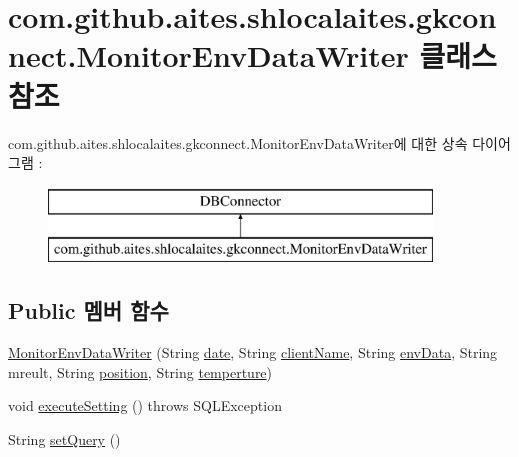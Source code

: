 \hypertarget{classcom_1_1github_1_1aites_1_1shlocalaites_1_1gkconnect_1_1_monitor_env_data_writer}{}\section{com.\+github.\+aites.\+shlocalaites.\+gkconnect.\+Monitor\+Env\+Data\+Writer 클래스 참조}
\label{classcom_1_1github_1_1aites_1_1shlocalaites_1_1gkconnect_1_1_monitor_env_data_writer}
com.\+github.\+aites.\+shlocalaites.\+gkconnect.\+Monitor\+Env\+Data\+Writer에 대한 상속 다이어그램 \+: \begin{figure}[H]
\begin{center}
\leavevmode
\includegraphics[height=2.000000cm]{classcom_1_1github_1_1aites_1_1shlocalaites_1_1gkconnect_1_1_monitor_env_data_writer}
\end{center}
\end{figure}
\subsection*{Public 멤버 함수}
\begin{DoxyCompactItemize}
\item 
\mbox{\hyperlink{classcom_1_1github_1_1aites_1_1shlocalaites_1_1gkconnect_1_1_monitor_env_data_writer_ab7d3d6af52342f720749695ec40aef43}{Monitor\+Env\+Data\+Writer}} (String \mbox{\hyperlink{classcom_1_1github_1_1aites_1_1shlocalaites_1_1gkconnect_1_1_monitor_env_data_writer_a04cac2bb3a2553675195bab75d11ecd4}{date}}, String \mbox{\hyperlink{classcom_1_1github_1_1aites_1_1shlocalaites_1_1gkconnect_1_1_monitor_env_data_writer_aace57a568b525d7bced3189c5ce11722}{client\+Name}}, String \mbox{\hyperlink{classcom_1_1github_1_1aites_1_1shlocalaites_1_1gkconnect_1_1_monitor_env_data_writer_a2f1b25081ef6c871c400583913e5a5a2}{env\+Data}}, String mreult, String \mbox{\hyperlink{classcom_1_1github_1_1aites_1_1shlocalaites_1_1gkconnect_1_1_monitor_env_data_writer_a087d637fddca614523c49e762de1e563}{position}}, String \mbox{\hyperlink{classcom_1_1github_1_1aites_1_1shlocalaites_1_1gkconnect_1_1_monitor_env_data_writer_a4360d90fa0ab7d3d76b2f4fd383f17da}{temperture}})
\item 
void \mbox{\hyperlink{classcom_1_1github_1_1aites_1_1shlocalaites_1_1gkconnect_1_1_monitor_env_data_writer_aa117721e9020fcc1de6abb9b7f79c367}{execute\+Setting}} ()  throws S\+Q\+L\+Exception 
\item 
String \mbox{\hyperlink{classcom_1_1github_1_1aites_1_1shlocalaites_1_1gkconnect_1_1_monitor_env_data_writer_a768d08920c68a3f139291d71eed6b14f}{set\+Query}} ()
\end{DoxyCompactItemize}
